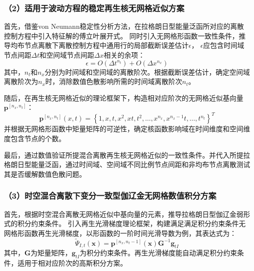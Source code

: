 \subsubsection*{\bfseries （2）适用于波动方程的稳定再生核无网格近似方案}
首先，借鉴von Neumann稳定性分析方法，在拉格朗日型能量泛函所对应的离散控制方程中引入特征解的傅立叶展开式。
同时引入无网格形函数一致性条件，推导均布节点离散下离散控制方程中通用行的局部截断误差估计$\epsilon$，
$\epsilon$应包含时间域节点间距$\Delta t$和空间域节点间距$\Delta x$相关的余项：
\begin{equation}
    \epsilon = O(\Delta t^{n_t}) + O(\Delta x^{n_x})
\end{equation}
其中，$n_t$和$n_x$分别为时间域和空间域的离散阶次。根据截断误差估计，确定空间域离散阶次为$n_x$时，消除数值色散影响所需的时间域离散阶次$n_t$。

随后，在再生核无网格近似的理论框架下，构造相对应阶次的无网格近似基向量$\boldsymbol p^{[n_x,n_t]}$：
\begin{equation}
    \boldsymbol p^{[n_x,n_t]}(x,t) = \left \{1, x, t, x^2, xt, t^2, \dots, x^{n_x}, x^{n_x-1}t, \dots, t^{n_t} \right \}^T
\end{equation}
并根据无网格形函数中矩量矩阵的可逆性，确定核函数影响域在时间维度和空间维度包含节点的个数。

    

最后，通过数值验证所提混合离散再生核无网格近似的一致性条件。并代入所提拉格朗日型能量泛函，通过时间域、空间域不同比例节点间距和非均布节点离散测试其是否缓解数值色散问题。

\subsubsection*{\bfseries （3）时空混合离散下变分一致型伽辽金无网格数值积分方案}
首先，根据时空混合离散无网格近似中基向量的元素，推导拉格朗日型伽辽金弱形式的积分约束条件。
引入再生光滑梯度理论框架，构建满足满足积分约束条件无网格形函数再生光滑梯度，以形函数的一阶时间光滑导数为例，其表达式为：
\begin{equation}
    \tilde \Psi_{I,t}(\boldsymbol x) = \boldsymbol p^{[n_x,n_t - 1]}(\boldsymbol x) \boldsymbol G^{ - 1} \boldsymbol g_{tI}
\end{equation}
其中，$\boldsymbol G$为矩量矩阵，$\boldsymbol g_{tI}$为积分约束条件。再生光滑梯度能自动满足积分约束条件，适用于相对应阶次的高斯积分方案。

